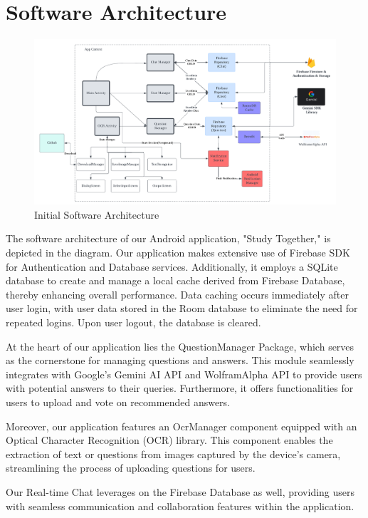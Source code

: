 \section{Software Architecture}\label{software_architecture}

\begin{figure}[h]
       \centering
       \includegraphics[width=\textwidth]{Figures/StudyTogether_Architecture.png}
       \caption{\footnotesize Initial Software Architecture}
       \label{StudyTogether_Architecture}
\end{figure}

The software architecture of our Android application, "Study Together," is depicted in the diagram. Our application makes extensive use of Firebase SDK for Authentication and Database services. Additionally, it employs a SQLite database to create and manage a local cache derived from Firebase Database, thereby enhancing overall performance. Data caching occurs immediately after user login, with user data stored in the Room database to eliminate the need for repeated logins. Upon user logout, the database is cleared.

At the heart of our application lies the QuestionManager Package, which serves as the cornerstone for managing questions and answers. This module seamlessly integrates with Google's Gemini AI API and WolframAlpha API to provide users with potential answers to their queries. Furthermore, it offers functionalities for users to upload and vote on recommended answers.

Moreover, our application features an OcrManager component equipped with an Optical Character Recognition (OCR) library. This component enables the extraction of text or questions from images captured by the device's camera, streamlining the process of uploading questions for users.

Our Real-time Chat leverages on the Firebase Database as well, providing users with seamless communication and collaboration features within the application.


 